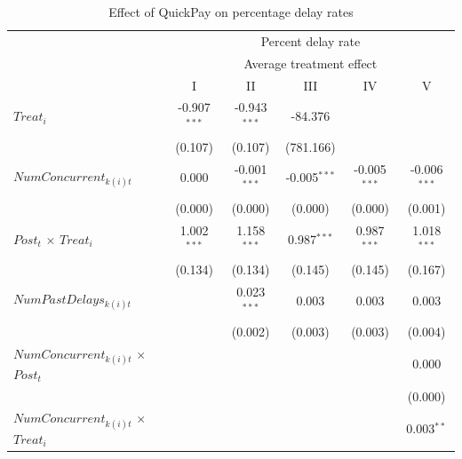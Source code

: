 \documentclass[
]{article}
\begin{document}
\begin{table}[htbp]
   \caption{Effect of QuickPay on percentage delay rates}
   \centering
   \small
   \begin{tabular}{lccccc}
      \toprule
       & \multicolumn{5}{c}{Percent delay rate}\\
       & \multicolumn{5}{c}{Average treatment effect} \\ 
                                                                     & I              & II             & III            & IV             & V\\  
      \midrule 
      $Treat_i$                                                      & -0.907$^{***}$ & -0.943$^{***}$ & -84.376        &                &   \\   
                                                                     & (0.107)        & (0.107)        & (781.166)      &                &   \\   
      $NumConcurrent_{k(i)t}$                                        & 0.000          & -0.001$^{***}$ & -0.005$^{***}$ & -0.005$^{***}$ & -0.006$^{***}$\\   
                                                                     & (0.000)        & (0.000)        & (0.000)        & (0.000)        & (0.001)\\   
      $Post_t$ $\times$ $Treat_i$                                    & 1.002$^{***}$  & 1.158$^{***}$  & 0.987$^{***}$  & 0.987$^{***}$  & 1.018$^{***}$\\   
                                                                     & (0.134)        & (0.134)        & (0.145)        & (0.145)        & (0.167)\\   
      $NumPastDelays_{k(i)t}$                                        &                & 0.023$^{***}$  & 0.003          & 0.003          & 0.003\\   
                                                                     &                & (0.002)        & (0.003)        & (0.003)        & (0.004)\\   
      $NumConcurrent_{k(i)t}$ $\times$ $Post_t$                      &                &                &                &                & 0.000\\   
                                                                     &                &                &                &                & (0.000)\\   
      $NumConcurrent_{k(i)t}$ $\times$ $Treat_i$                     &                &                &                &                & 0.003$^{**}$\\   

\end{tabular}
\end{table}
\end{document}
